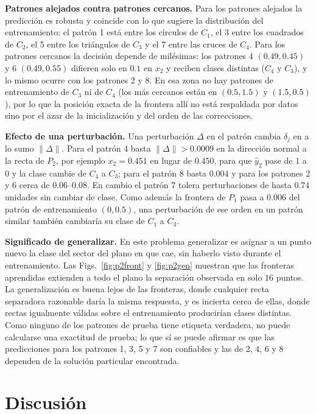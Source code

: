 \documentclass[conference]{IEEEtran}
\begin{document}
\textbf{Patrones alejados contra patrones cercanos.} Para los patrones
alejados la predicción es robusta y coincide con lo que sugiere la
distribución del entrenamiento: el patrón 1 está entre los círculos de
$C_1$, el 3 entre los cuadrados de $C_2$, el 5 entre los triángulos de $C_3$
y el 7 entre las cruces de $C_4$. Para los patrones cercanos la decisión
depende de milésimas: los patrones 4 $(0.49,0.45)$ y 6 $(0.49,0.55)$
difieren solo en $0.1$ en $x_2$ y reciben clases distintas ($C_4$ y $C_3$),
y lo mismo ocurre con los patrones 2 y 8. En esa zona no hay patrones de
entrenamiento de $C_3$ ni de $C_4$ (los más cercanos están en $(0.5,1.5)$ y
$(1.5,0.5)$), por lo que la posición exacta de la frontera allí no está
respaldada por datos sino por el azar de la inicialización y del orden de
las correcciones.

\textbf{Efecto de una perturbación.} Una perturbación $\Delta$ en el patrón
cambia $\delta_j$ en a lo sumo $\|\Delta\|$. Para el patrón 4 basta
$\|\Delta\|>0.0009$ en la dirección normal a la recta de $P_2$, por ejemplo
$x_2=0.451$ en lugar de $0.450$, para que $\hat y_2$ pase de $1$ a $0$ y la
clase cambie de $C_4$ a $C_3$; para el patrón 8 basta $0.004$ y para los
patrones 2 y 6 cerca de $0.06$--$0.08$. En cambio el patrón 7 tolera
perturbaciones de hasta $0.74$ unidades sin cambiar de clase. Como además la
frontera de $P_1$ pasa a $0.006$ del patrón de entrenamiento $(0,0.5)$, una
perturbación de ese orden en un patrón similar también cambiaría su clase de
$C_1$ a $C_3$.

\textbf{Significado de generalizar.} En este problema generalizar es asignar
a un punto nuevo la clase del sector del plano en que cae, sin haberlo visto
durante el entrenamiento. Las Figs.~\ref{fig:p2front} y \ref{fig:p2gen}
muestran que las fronteras aprendidas extienden a todo el plano la
separación observada en solo $16$ puntos. La generalización es buena lejos
de las fronteras, donde cualquier recta separadora razonable daría la misma
respuesta, y es incierta cerca de ellas, donde rectas igualmente válidas
sobre el entrenamiento producirían clases distintas. Como ninguno de los
patrones de prueba tiene etiqueta verdadera, no puede calcularse una
exactitud de prueba; lo que sí se puede afirmar es que las predicciones para
los patrones 1, 3, 5 y 7 son confiables y las de 2, 4, 6 y 8 dependen de la
solución particular encontrada.

\section{Discusión}
\end{document}

